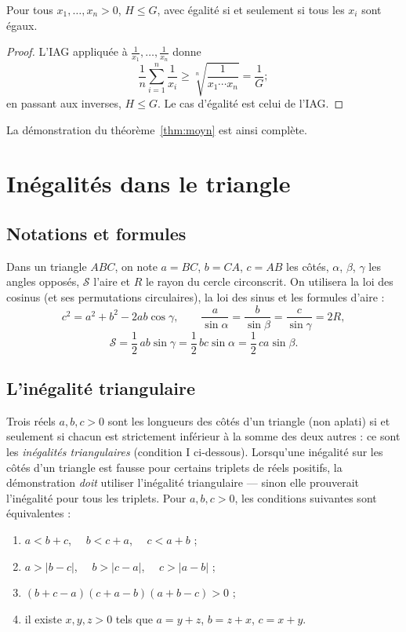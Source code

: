 \documentclass[11pt]{article}
\begin{document}
\begin{proposition}\label{cor:HG}
Pour tous $x_1, \ldots, x_n > 0$, $H \leqslant G$, avec égalité si et seulement
si tous les $x_i$ sont égaux.
\end{proposition}

\begin{proof}
L'IAG appliquée à $\frac{1}{x_1}, \ldots, \frac{1}{x_n}$ donne
\[
\frac1n \sum_{i=1}^{n} \frac{1}{x_i} \geqslant \sqrt[n]{\frac{1}{x_1 \cdots x_n}}
= \frac{1}{G} ;
\]
en passant aux inverses, $H \leqslant G$. Le cas d'égalité est celui de l'IAG.
\end{proof}

La démonstration du théorème~\ref{thm:moyn} est ainsi complète.

\section{Inégalités dans le triangle}\label{sec:inegalites-triangle}

\subsection*{Notations et formules}

Dans un triangle $ABC$, on note $a = BC$, $b = CA$, $c = AB$ les côtés,
$\alpha$, $\beta$, $\gamma$ les angles opposés, $\mathcal{S}$ l'aire et $R$
le rayon du cercle circonscrit. On utilisera
la loi des cosinus (et ses permutations circulaires), la loi des sinus et
les formules d'aire :
\[
c^2 = a^2 + b^2 - 2ab\cos\gamma ,
\qquad
\frac{a}{\sin\alpha} = \frac{b}{\sin\beta} = \frac{c}{\sin\gamma} = 2R,
\]
\[
\mathcal{S} = \frac12\,ab\sin\gamma = \frac12\,bc\sin\alpha = \frac12\,ca\sin\beta .
\]

\subsection*{L'inégalité triangulaire}

Trois réels $a, b, c > 0$ sont les longueurs des côtés d'un triangle (non
aplati) si et seulement si chacun est strictement inférieur à la somme des
deux autres : ce sont les \emph{inégalités triangulaires} (condition I
ci-dessous). Lorsqu'une inégalité sur les côtés d'un triangle est fausse
pour certains triplets de réels positifs, la démonstration \emph{doit}
utiliser l'inégalité triangulaire --- sinon elle prouverait l'inégalité
pour tous les triplets. Pour $a, b, c > 0$, les conditions suivantes sont
équivalentes :
\begin{enumerate}
  \item[I.] $a < b + c$, $\quad b < c + a$, $\quad c < a + b$ ;
  \item[II.] $a > |b - c|$, $\quad b > |c - a|$, $\quad c > |a - b|$ ;
  \item[III.] $(b + c - a)(c + a - b)(a + b - c) > 0$ ;
  \item[IV.] il existe $x, y, z > 0$ tels que $a = y + z$, $b = z + x$,
  $c = x + y$.
\end{enumerate}
\end{document}
